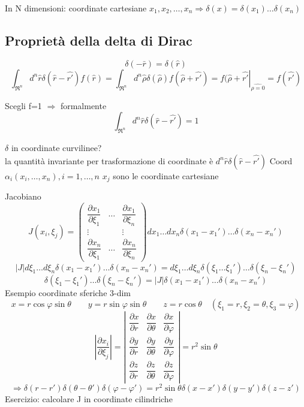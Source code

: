 \documentclass[a4paper,11pt]{report}
\begin{document}
In N dimensioni: coordinate cartesiane $x_1,x_2,\dots,x_n \Rightarrow \delta(x)= \delta(x_1)\dots \delta(x_n)$

\subsection{Proprietà della delta di Dirac}
$$\delta(-\bar{r})=\delta(\hat{r})$$
\begin{equation}
\int_{\Re^n} d^n\hat{r}\delta(\hat{r}-\hat{r'})f(\hat{r}) = \int_{\Re^n}d^n\hat{\rho}\delta(\hat{\rho})f(\hat{\rho}+\hat{r'})=\left.f(\hat{\rho}+\hat{r'}\right|_{\hat{\rho=0}}=f(\hat{r'})
\end{equation}

Scegli f=1 $\Rightarrow$ formalmente 
\begin{equation}
\int_{\Re^n}d^n\hat{r}\delta(\hat{r}-\hat{r'})=1
\end{equation}


$\delta$ in coordinate curvilinee?\\
la quantità invariante per trasformazione di coordinate è $d^n\hat{r}\delta(\hat{r}-\hat{r'})$
Coord $\alpha_i (x_i,\dots,x_n),i=1,\dots,n$
$x_j$ sono le coordinate cartesiane

Jacobiano
$$
J(x_i,\xi_j)=\left(\begin{matrix}
\dfrac{\partial x_1}{\partial \xi_1} & \dots & \dfrac{\partial x_1}{\partial \xi_n}\\
\vdots & & \vdots \\
\dfrac{\partial x_n}{\partial \xi_1} & \dots &\dfrac{\partial x_n}{\partial \xi_n}
\end{matrix}\right)dx_1\dots dx_n \delta(x_1-x_1')\dots \delta(x_n - x_n')
$$
$$
|J|d\xi_1\dots d\xi_n \delta(x_1 - x_1')\dots \delta(x_n-x_n')=d\xi_1 \dots d\xi_n\delta(\xi_1\dots \xi_1')\dots \delta(\xi_n - \xi_n')
$$
\begin{equation}
\delta(\xi_1-\xi_1')\dots\delta(\xi_n-\xi_n')=|J|\delta(x_1-x_1')\dots\delta(x_n-x_n')
\end{equation}
Esempio coordinate sferiche 3-dim
$$
x=r\cos\varphi\sin\theta \qquad y=r\sin\varphi\sin\theta \qquad z=r\cos\theta \quad (\xi_1=r,\xi_2=\theta,\xi_3=\varphi)
$$
$$\left|\dfrac{\partial x_i}{\partial \xi_j}\right|=\left|\begin{matrix}
\dfrac{\partial x}{\partial r} & \dfrac{\partial x}{\partial \theta} & \dfrac{\partial x}{\partial \varphi} \\
\dfrac{\partial y}{\partial r} & \dfrac{\partial y}{\partial \theta} & \dfrac{\partial y}{\partial \varphi}\\
\dfrac{\partial z}{\partial r} & \dfrac{\partial z}{\partial \theta} & \dfrac{\partial z}{\partial \varphi}
\end{matrix}\right|=r^2\sin\theta
$$
\begin{equation}
\Rightarrow \delta(r-r')\delta(\theta - \theta')\delta(\varphi - \varphi') = r^2\sin\theta \delta(x-x')\delta(y-y')\delta(z-z')
\end{equation}
Esercizio: calcolare J in coordinate cilindriche
\end{document}
